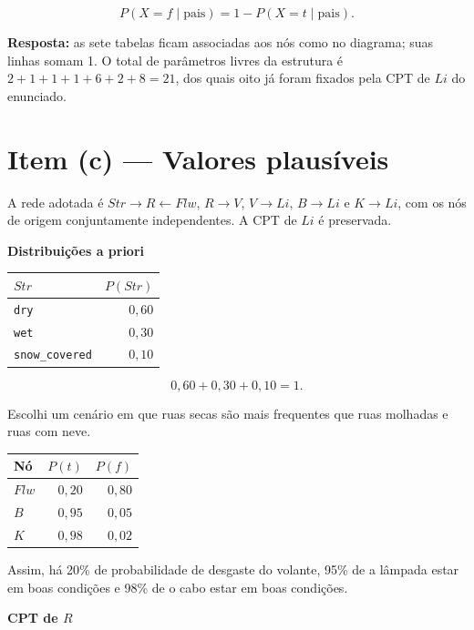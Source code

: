 \documentclass[11pt,a4paper]{article}
\newcommand{\itemtitle}[2]{\section*{\textcolor{accent}{Item (#1) --- #2}}}
\newcommand{\subtitulo}[1]{\par\medskip\textbf{\textcolor{accent}{#1}}\par}
\begin{document}
\[
P(X=f\mid\text{pais})=1-P(X=t\mid\text{pais}).
\]

\textbf{Resposta:} as sete tabelas ficam associadas aos nós como no diagrama; suas linhas somam 1. O total de parâmetros livres da estrutura é \(2+1+1+1+6+2+8=21\), dos quais oito já foram fixados pela CPT de \(Li\) do enunciado.

\clearpage
\itemtitle{c}{Valores plausíveis}\label{item-c}

A rede adotada é \(Str\to R\leftarrow Flw\), \(R\to V\), \(V\to Li\), \(B\to Li\) e \(K\to Li\), com os nós de origem conjuntamente independentes. A CPT de \(Li\) é preservada.

\subtitulo{Distribuições a priori}\label{distribuiuxe7uxf5es-a-priori}

{\def\LTcaptype{none} %
\begin{longtable}[]{@{}lr@{}}
\toprule\noalign{}
\(Str\) & \(P(Str)\) \\
\midrule\noalign{}
\endhead
\bottomrule\noalign{}
\endlastfoot
\texttt{dry} & \(0{,}60\) \\
\texttt{wet} & \(0{,}30\) \\
\texttt{snow\_covered} & \(0{,}10\) \\
\end{longtable}
}

\[
0{,}60+0{,}30+0{,}10=1.
\]

Escolhi um cenário em que ruas secas são mais frequentes que ruas molhadas e ruas com neve.

{\def\LTcaptype{none} %
\begin{longtable}[]{@{}lrr@{}}
\toprule\noalign{}
Nó & \(P(t)\) & \(P(f)\) \\
\midrule\noalign{}
\endhead
\bottomrule\noalign{}
\endlastfoot
\(Flw\) & \(0{,}20\) & \(0{,}80\) \\
\(B\) & \(0{,}95\) & \(0{,}05\) \\
\(K\) & \(0{,}98\) & \(0{,}02\) \\
\end{longtable}
}

Assim, há 20\% de probabilidade de desgaste do volante, 95\% de a lâmpada estar em boas condições e 98\% de o cabo estar em boas condições.

\subtitulo{\texorpdfstring{CPT de \(R\)}{CPT de R}}\label{cpt-de-r-1}
\end{document}
